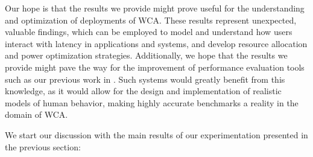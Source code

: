 Our hope is that the results we provide might prove useful for the understanding and optimization of deployments of
WCA.\@
These results represent unexpected, valuable findings, which can be employed to model and understand how users
interact with latency in applications and systems, and develop resource allocation and power optimization strategies.
Additionally, we hope that the results we provide might pave the way for the improvement of performance evaluation
tools such as our previous work in \cite{olguin:2018, olguin:2019}.
Such systems would greatly benefit from this knowledge, as it would allow for the design and implementation of
realistic models of human behavior, making highly accurate benchmarks a reality in the domain of WCA.\@


We start our discussion with the main results of our experimentation presented in the previous section:

